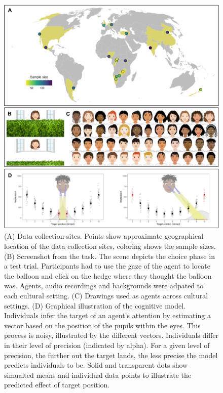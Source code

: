 \documentclass[
  man,floatsintext]{apa6}
\begin{document}
\begin{figure}

{\centering \includegraphics[width=0.75\linewidth]{../visuals/fig1} 

}

\caption{(A) Data collection sites. Points show approximate geographical location of the data collection sites, coloring shows the sample sizes. (B) Screenshot from the task. The scene depicts the choice phase in a test trial. Participants had to use the gaze of the agent to locate the balloon and click on the hedge where they thought the balloon was. Agents, audio recordings and backgrounds were adpated to each cultural setting. (C) Drawings used as agents across cultural settings. (D) Graphical illustration of the cognitive model. Individuals infer the target of an agent's attention by estimating a vector based on the position of the pupils within the eyes. This process is noisy, illustrated by the different vectors. Individuals differ in their level of precision (indicated by alpha). For a given level of precision, the further out the target lands, the less precise the model predicts individuals to be. Solid and transparent dots show simualted means and individual data points to illustrate the predicted effect of target position.}\label{fig:fig1}
\end{figure}
\end{document}
